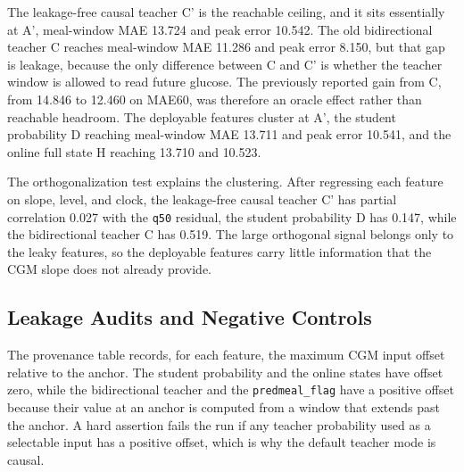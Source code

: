 \begin{table}[t]
    \centering
    \caption{Reachable ceiling and leakage diagnostics on the non-insulin cohort. A' is the slope and clock baseline, C' is the leakage-free causal teacher ceiling, C and B are bidirectional-teacher leakage diagnostics. Lower is better for MAE, peak, and time to peak, higher is better for AUPRC and recall.}
    \label{tab:meal-main-results}
    
\end{table}

The leakage-free causal teacher C' is the reachable ceiling, and it sits essentially at A', meal-window MAE 13.724 and peak error 10.542. The old bidirectional teacher C reaches meal-window MAE 11.286 and peak error 8.150, but that gap is leakage, because the only difference between C and C' is whether the teacher window is allowed to read future glucose. The previously reported gain from C, from 14.846 to 12.460 on MAE60, was therefore an oracle effect rather than reachable headroom. The deployable features cluster at A', the student probability D reaching meal-window MAE 13.711 and peak error 10.541, and the online full state H reaching 13.710 and 10.523.

\begin{table}[t]
    \centering
    \caption{Deployable causal representations against A' on the gate endpoints.}
    \label{tab:meal-causal-results}
    
\end{table}

The orthogonalization test explains the clustering. After regressing each feature on slope, level, and clock, the leakage-free causal teacher C' has partial correlation 0.027 with the \texttt{q50} residual, the student probability D has 0.147, while the bidirectional teacher C has 0.519. The large orthogonal signal belongs only to the leaky features, so the deployable features carry little information that the CGM slope does not already provide.

\begin{table}[t]
    \centering
    \caption{Partial-information test against the CGM slope. Partial correlation with the q50 residual after removing slope, level, and clock, and the change in gate endpoints from adding the orthogonalized feature to the slope-only model.}
    \label{tab:meal-partial-information}
    
\end{table}

\subsection{Leakage Audits and Negative Controls}
\label{subsec:meal-leakage-controls}
The provenance table records, for each feature, the maximum CGM input offset relative to the anchor. The student probability and the online states have offset zero, while the bidirectional teacher and the \texttt{predmeal\_flag} have a positive offset because their value at an anchor is computed from a window that extends past the anchor. A hard assertion fails the run if any teacher probability used as a selectable input has a positive offset, which is why the default teacher mode is causal.

